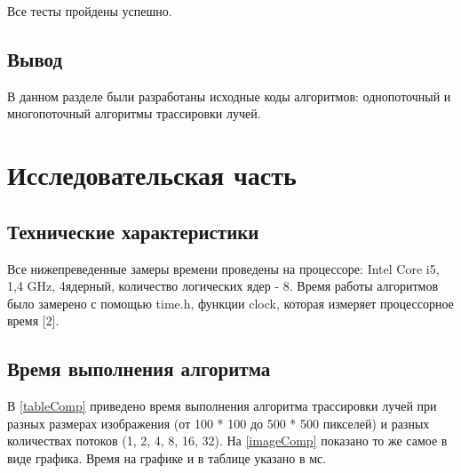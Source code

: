 \documentclass[12pt]{report}
\begin{document}
Все тесты пройдены успешно.
\newpage
\section{Вывод}

В данном разделе были разработаны исходные коды алгоритмов: однопоточный и многопоточный алгоритмы трассировки лучей.

\chapter{Исследовательская часть}

\section{Технические характеристики}

Все нижепреведенные замеры времени проведены на процессоре: Intel Core i5, 1,4 GHz, 4ядерный, количество логических ядер - 8. Время работы алгоритмов было замерено с помощью time.h, функции clock, которая измеряет процессорное время [2].


\section{Время выполнения алгоритма}
В \ref{tableComp} приведено время выполнения алгоритма трассировки лучей при разных размерах изображения (от 100 * 100 до 500 * 500 пикселей) и разных количествах потоков (1, 2, 4, 8, 16, 32). На \ref{imageComp} показано то же самое в виде графика. Время на графике и в таблице указано в мс.
\end{document}
